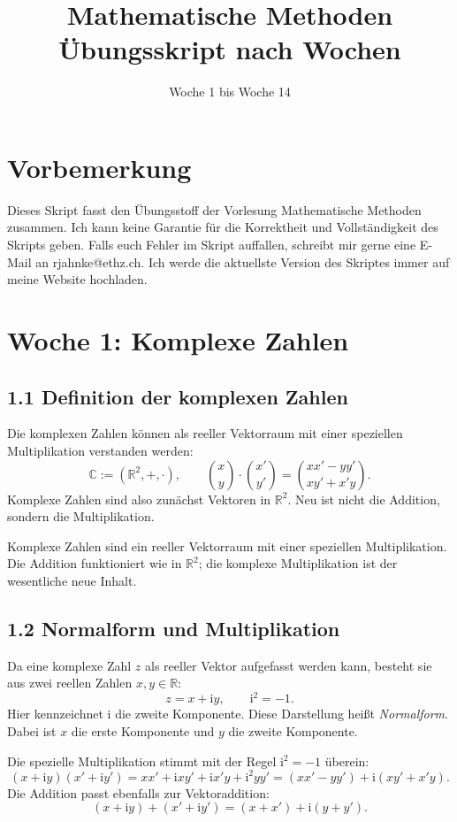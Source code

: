 \documentclass[11pt,a4paper]{article}
\title{Mathematische Methoden\\Übungsskript nach Wochen}
\author{}
\date{Woche 1 bis Woche 14}
\newcommand{\C}{\mathbb C}
\newcommand{\R}{\mathbb R}
\newcommand{\ii}{\mathrm i}
\begin{document}
\maketitle
\tableofcontents
\newpage

\section*{Vorbemerkung}
Dieses Skript fasst den Übungsstoff der Vorlesung Mathematische Methoden zusammen. Ich kann keine Garantie für die Korrektheit und Vollständigkeit des Skripts geben. Falls euch
Fehler im Skript auffallen, schreibt mir gerne eine E-Mail an rjahnke@ethz.ch. Ich werde die
aktuellste Version des Skriptes immer auf meine Website hochladen.

\section{Woche 1: Komplexe Zahlen}

\subsection{1.1 Definition der komplexen Zahlen}
Die komplexen Zahlen können als reeller Vektorraum mit einer speziellen Multiplikation verstanden werden:
\[
\C := \left(\R^2,+,\cdot\right), \qquad
\binom{x}{y}\cdot\binom{x'}{y'}=
\binom{xx'-yy'}{xy'+x'y}.
\]
Komplexe Zahlen sind also zunächst Vektoren in $\R^2$. Neu ist nicht die Addition, sondern die Multiplikation.

\begin{importantbox}
Komplexe Zahlen sind ein reeller Vektorraum mit einer speziellen Multiplikation. Die Addition funktioniert wie in $\R^2$; die komplexe Multiplikation ist der wesentliche neue Inhalt.
\end{importantbox}

\subsection{1.2 Normalform und Multiplikation}
Da eine komplexe Zahl $z$ als reeller Vektor aufgefasst werden kann, besteht sie aus zwei reellen Zahlen $x,y\in\R$:
\[
 z=x+\ii y, \qquad \ii^2=-1.
\]
Hier kennzeichnet $\ii$ die zweite Komponente. Diese Darstellung heißt \emph{Normalform}. Dabei ist $x$ die erste Komponente und $y$ die zweite Komponente.

Die spezielle Multiplikation stimmt mit der Regel $\ii^2=-1$ überein:
\[
(x+\ii y)(x'+\ii y')=xx'+\ii xy'+\ii x'y+\ii^2yy'
=(xx'-yy')+\ii(xy'+x'y).
\]
Die Addition passt ebenfalls zur Vektoraddition:
\[
(x+\ii y)+(x'+\ii y')=(x+x')+\ii(y+y').
\]
\end{document}
